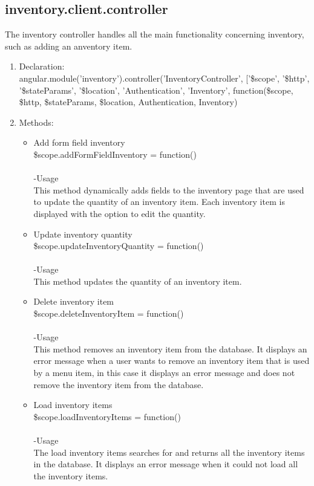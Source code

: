 \documentclass[a4paper,12pt]{article}
\begin{document}
\subsection{inventory.client.controller}
 The inventory controller handles all the main functionality concerning inventory, such as adding an anventory item.
\begin{enumerate}
\item Declaration:\\angular.module('inventory').controller('InventoryController', ['\$scope', '\$http', '\$stateParams', '\$location', 'Authentication', 'Inventory',
	function(\$scope, \$http, \$stateParams, \$location, Authentication, Inventory)
\item Methods:
	\begin{itemize}
	\item Add form field inventory\\
  \$scope.addFormFieldInventory = function()\\ \\
  -Usage\\ 
  This method dynamically adds fields to the inventory page that are used to update the quantity of an inventory item. Each inventory item is displayed with the option to edit the quantity.
\item  Update inventory quantity\\
 \$scope.updateInventoryQuantity = function()\\ \\
 -Usage\\
 This method updates the quantity of an inventory item.
 \item Delete inventory item\\
  \$scope.deleteInventoryItem = function()\\ \\
  -Usage\\ 
  This method removes an inventory item from the database. It displays an error message when a user wants to remove an inventory item that is used by a menu item, in this case it displays an error message and does not remove the inventory item from the database.
  \item Load inventory items\\
   \$scope.loadInventoryItems = function()\\ \\
   -Usage\\
   The load inventory items searches for and returns all the inventory items in the database. It displays an error message when it could not load all the inventory items.

\end{itemize}
\end{enumerate}
\end{document}
